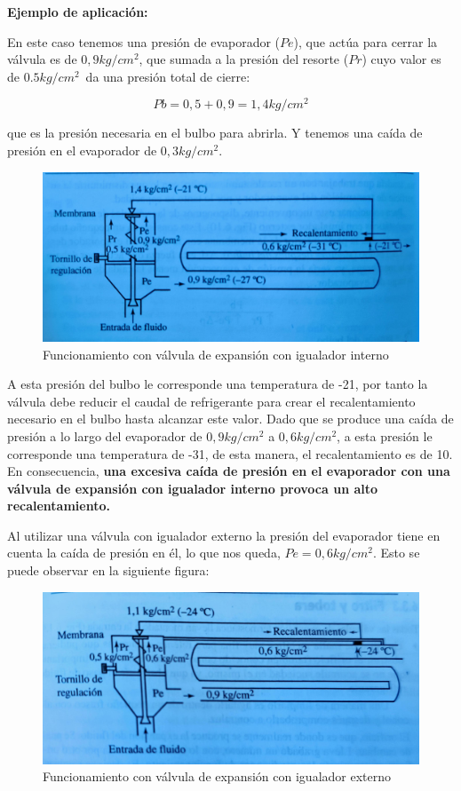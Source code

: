 \textbf{Ejemplo de aplicaci\'on:}

En este caso tenemos una presi\'on de evaporador ($Pe$), que act\'ua para cerrar la v\'alvula es de $0,9 kg/cm^2$, que sumada a la presi\'on del resorte ($Pr$) cuyo valor es de $0.5 kg/cm^2$\ da una presi\'on total de cierre:

\begin{equation*}
    Pb = 0,5 + 0,9 = 1,4 kg/cm^2
\end{equation*}

que es la presi\'on necesaria en el bulbo para abrirla. Y tenemos una ca\'ida de presi\'on en el evaporador de $0,3 kg/cm^2$.

\begin{figure}[H]
    \centering
    \includegraphics[width=0.6\linewidth]{figuras/dispositivos-de-expansion/funcionamiento-valvula-igualador-interno.jpg}
    \caption{Funcionamiento con v\'alvula de expansi\'on con igualador interno}
    \label{fig:valvula-igualador-interno}
\end{figure}

A esta presi\'on del bulbo le corresponde una temperatura de -21\textcelsius, por tanto la v\'alvula debe reducir el caudal de refrigerante para crear el recalentamiento necesario en el bulbo hasta alcanzar este valor. Dado que se produce una ca\'ida de presi\'on a lo largo del evaporador de $0,9 kg/cm^2$ a $0,6 kg/cm^2$, a esta presi\'on le corresponde una temperatura de -31\textcelsius, de esta manera, el recalentamiento es de 10\textcelsius. En consecuencia, \textbf{una excesiva ca\'ida de presi\'on en el evaporador con una v\'alvula de expansi\'on con igualador interno provoca un alto recalentamiento.}

Al utilizar una v\'alvula con igualador externo la presi\'on del evaporador tiene en cuenta la ca\'ida de presi\'on en \'el, lo que nos queda, $Pe = 0,6 kg/cm^2$. Esto se puede observar en la siguiente figura:

\begin{figure}[htbp]
    \centering
    \includegraphics[width=.6\linewidth]{figuras/dispositivos-de-expansion/funcionamiento-valvula-igualador-externo.jpg}
    \caption{Funcionamiento con v\'alvula de expansi\'on con igualador externo}
    \label{fig:valvula-igualador-externo}
\end{figure}

